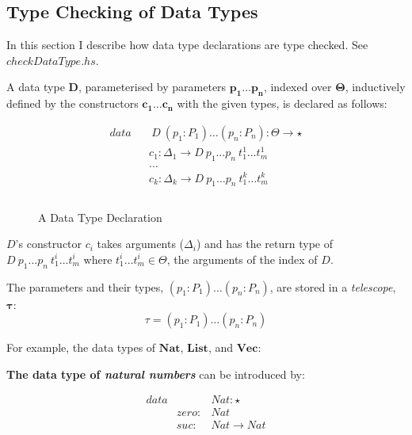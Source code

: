\subsection{Type Checking of Data Types}
\label{sec:datatypes}

In this section I describe how data type declarations are type checked. See \emph{$checkDataType.hs$}.

A data type $\boldsymbol{D}$, parameterised by parameters $\boldsymbol{p_1 \dots p_n}$, indexed over $\boldsymbol{\Theta}$, inductively defined by the constructors $\boldsymbol{c_1 \dots c_n}$ with the given types, is declared as follows:

\begin{figure}[H]
  \centering
  \begin{equation*}
    \begin{aligned}
      data &  & \: D \: (p_1:P_1) \dots (p_n:P_n) : \Theta \to \star       \\
           &  & c_1 : \Delta_1 \to D \: p_1 \dots p_n \: t_1^1 \dots t_m^1 \\
           &  & \dots                                                      \\
           &  & c_k : \Delta_k \to D \: p_1 \dots p_n \: t_1^k \dots t_m^k \\                                                           \\
    \end{aligned}
  \end{equation*}
  \caption{A Data Type Declaration}
  \label{fig:datatype}
\end{figure}

$D$'s constructor $c_i$ takes arguments ($\Delta_i$) and has the return type of $D \: p_1 \dots p_n \: t_1^i \dots t_m^i$ where $t_1^i \dots t_m^i \in \Theta$, the arguments of the index of $D$.

The parameters and their types, $(p_1:P_1) \dots (p_n:P_n)$, are stored in a \emph{telescope}, $\boldsymbol{\tau}$:
\begin{equation*}
  \tau = (p_1:P_1) \dots (p_n:P_n)
\end{equation*}


For example, the data types of $\boldsymbol{Nat}$, $\boldsymbol{List}$, and $\boldsymbol{Vec}$:

\textbf{The data type of \emph{natural numbers}} can be introduced by:

\begin{equation*}
  \begin{aligned}
    data &       & Nat : \star \\
         & zero: & Nat         \\
         & suc:  & Nat \to Nat \\
  \end{aligned}
\end{equation*}

